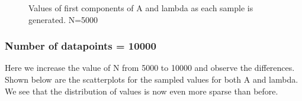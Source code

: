 \documentclass{article}
\begin{document}
\begin{figure}[H]
	\centerline{
		}
	\caption{Values of first components of A and lambda as each sample is generated. N=5000}
	\label{1.fig:r2_seq}
\end{figure}

\subsubsection{Number of datapoints = 10000} %
Here we increase the value of N from 5000 to 10000 and observe the differences.
Shown below are the scatterplots for the sampled values for both A and lambda. We see that the distribution of values is now even more sparse than before. 
\end{document}
